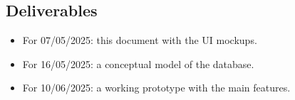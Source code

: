 \subsection{Deliverables}
\begin{itemize}
    \item For 07/05/2025: this document with the UI mockups.
    \item For 16/05/2025: a conceptual model of the database.
    \item For 10/06/2025: a working prototype with the main features.
\end{itemize}
